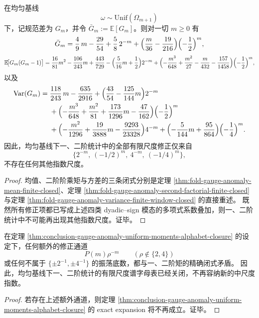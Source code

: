 \begin{theorem}\label{thm:conclusion-gauge-anomaly-uniform-moments-alphabet-closure}
在均匀基线
\[
\omega\sim \mathrm{Unif}(\Omega_{m+1})
\]
下，记规范差为 \(G_m\)，并令 \(\bar G_m:=\mathbb E[G_m]\)。则对一切 \(m\ge 0\) 有
\[
\bar G_m
=
\frac49\,m-\frac{29}{54}
+\frac58\,2^{-m}
+\Bigl(\frac{m}{36}-\frac{19}{216}\Bigr)\Bigl(-\frac12\Bigr)^m,
\]
\[
\mathbb E\!\bigl[G_m(G_m-1)\bigr]
=\frac{16}{81}m^2-\frac{106}{243}m+\frac{443}{729}
-\Bigl(\frac{5}{16}m+\frac12\Bigr)2^{-m}
+\Bigl(-\frac{m^3}{648}+\frac{m^2}{27}-\frac{m}{432}-\frac{157}{1458}\Bigr)\Bigl(-\frac12\Bigr)^m,
\]
以及
\[
\begin{aligned}
\operatorname{Var}(G_m)
={}&\frac{118}{243}\,m-\frac{635}{2916}
+\Bigl(\frac{43}{54}-\frac{125}{144}m\Bigr)2^{-m}\\
&+\Bigl(-\frac{m^3}{648}+\frac{m^2}{81}+\frac{173}{1296}m-\frac{47}{162}\Bigr)\Bigl(-\frac12\Bigr)^m\\
&+\Bigl(-\frac{m^2}{1296}+\frac{19}{3888}m-\frac{9293}{23328}\Bigr)4^{-m}
+\Bigl(-\frac{5}{144}m+\frac{95}{864}\Bigr)\Bigl(-\frac14\Bigr)^m.
\end{aligned}
\]
因此，均匀基线下一、二阶统计中的全部有限尺度修正仅来自
\[
\bigl\{2^{-m},\ (-1/2)^m,\ 4^{-m},\ (-1/4)^m\bigr\},
\]
不存在任何其他指数尺度。
\end{theorem}
\begin{proof}
均值、二阶阶乘矩与方差的三条闭式分别是定理 \ref{thm:fold-gauge-anomaly-mean-finite-closed}、定理 \ref{thm:fold-gauge-anomaly-second-factorial-finite-closed} 与定理 \ref{thm:fold-gauge-anomaly-variance-finite-window-closed} 的直接重述。
既然所有修正项都已写成上述四类 dyadic--sign 模态的多项式系数叠加，则一、二阶统计中不可能再出现其他指数尺度。证毕。
\end{proof}

\begin{corollary}[中尺度指数的严格排斥]\label{cor:conclusion-gauge-anomaly-no-mesoscopic-exponents}
在定理 \ref{thm:conclusion-gauge-anomaly-uniform-moments-alphabet-closure} 的设定下，任何额外的修正通道
\[
P(m)\rho^{-m}\qquad (\rho\notin\{2,4\})
\]
或任何不属于 \(\{\pm 2^{-1},\pm 4^{-1}\}\) 的振荡底数，都与一、二阶矩的精确闭式矛盾。
因此，均匀基线下一、二阶统计的有限尺度谱字母表已经关闭，不再容纳新的中尺度指数。
\end{corollary}
\begin{proof}
若存在上述额外通道，则定理 \ref{thm:conclusion-gauge-anomaly-uniform-moments-alphabet-closure} 的 exact expansion 将不再成立。证毕。
\end{proof}

